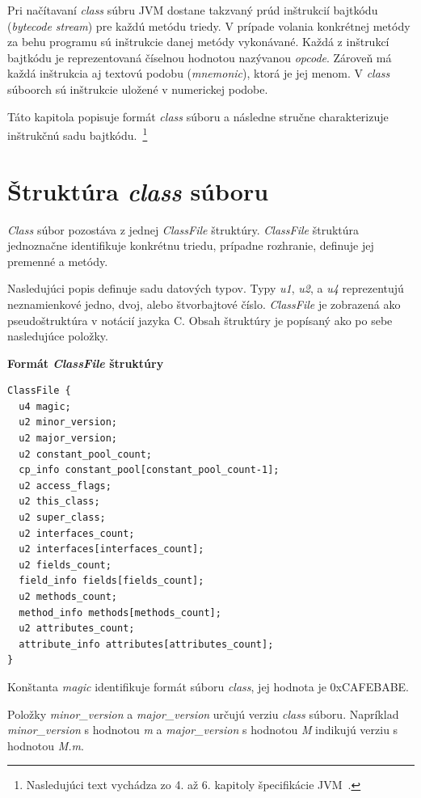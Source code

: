 \documentclass[11pt,final,oneside]{fithesis}
\newenvironment{example}[1]
{
\vspace{3mm}
\noindent\textbf{#1}
\vspace{2mm}
}
{
\vspace{3mm}
}
\begin{document}
Pri načítavaní \textit{class} súbru JVM dostane takzvaný prúd inštrukcií
bajtkódu (\textit{bytecode stream}) pre každú metódu triedy. V prípade volania
konkrétnej metódy za behu programu sú inštrukcie danej metódy vykonávané.
Každá z inštrukcí bajtkódu je reprezentovaná číselnou hodnotou nazývanou
\textit{opcode}. Zároveň má každá inštrukcia aj textovú podobu (\textit
{mnemonic}), ktorá je jej menom. V \textit{class} súboorch sú
inštrukcie uložené v numerickej podobe.

Táto kapitola popisuje formát \textit{class} súboru a následne stručne
charakterizuje inštrukčnú sadu bajtkódu.~\footnote{Nasledujúci text vychádza 
zo 4. až 6. kapitoly špecifikácie JVM~\cite{Lindholm:2013:JVM:2462629}.}

\section{Štruktúra \textit{class} súboru}
\label{sec:classFile}
\textit{Class} súbor pozostáva z jednej \textit{ClassFile} štruktúry. \textit
{ClassFile} štruktúra jednoznačne identifikuje konkrétnu triedu, prípadne
rozhranie, definuje jej premenné a metódy.

Nasledujúci popis definuje sadu datových typov. Typy \textit {u1},
\textit {u2}, a \textit {u4} reprezentujú neznamienkové jedno, dvoj, alebo
štvorbajtové číslo. \textit {ClassFile} je zobrazená ako pseudoštruktúra v
notácií jazyka C. Obsah štruktúry je popísaný ako po sebe nasledujúce položky.

\begin{example}{Formát \textit{ClassFile} štruktúry}
\begin{verbatim}
ClassFile {
  u4 magic;
  u2 minor_version;
  u2 major_version;
  u2 constant_pool_count;
  cp_info constant_pool[constant_pool_count-1];
  u2 access_flags;
  u2 this_class;
  u2 super_class;
  u2 interfaces_count;
  u2 interfaces[interfaces_count];
  u2 fields_count;
  field_info fields[fields_count];
  u2 methods_count;
  method_info methods[methods_count];
  u2 attributes_count;
  attribute_info attributes[attributes_count];
}
\end{verbatim}
\end{example}

Konštanta \textit{magic} identifikuje formát súboru \textit{class},
jej hodnota je 0xCAFEBABE.

Položky \textit{minor\_version} a \textit{major\_version}
určujú verziu \textit{class} súboru. Napríklad \textit{minor\_version} s
hodnotou \textit{m} a \textit{major\_version} s hodnotou \textit{M} indikujú
verziu s hodnotou \textit{M.m}.
\end{document}
